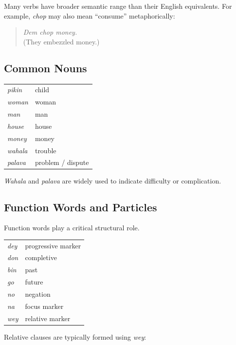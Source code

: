 \documentclass[12pt]{article}
\begin{document}
Many verbs have broader semantic range than their English equivalents. For example, \textit{chop} may also mean ``consume'' metaphorically:

\begin{quote}
\textit{Dem chop money.} \\
(They embezzled money.)
\end{quote}

\subsection{Common Nouns}

\begin{center}
\begin{tabular}{ll}
\textit{pikin} & child \\
\textit{woman} & woman \\
\textit{man} & man \\
\textit{house} & house \\
\textit{money} & money \\
\textit{wahala} & trouble \\
\textit{palava} & problem / dispute \\
\end{tabular}
\end{center}

\textit{Wahala} and \textit{palava} are widely used to indicate difficulty or complication.

\subsection{Function Words and Particles}

Function words play a critical structural role.

\begin{center}
\begin{tabular}{ll}
\textit{dey} & progressive marker \\
\textit{don} & completive \\
\textit{bin} & past \\
\textit{go} & future \\
\textit{no} & negation \\
\textit{na} & focus marker \\
\textit{wey} & relative marker \\
\end{tabular}
\end{center}

Relative clauses are typically formed using \textit{wey}:
\end{document}
